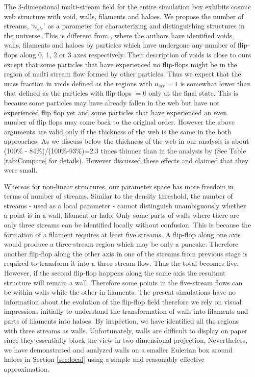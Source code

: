 The 3-dimensional multi-stream field for the entire simulation box exhibits cosmic web structure with void, walls, filaments and haloes. We propose the number of streams, `$n_{str}$' as a parameter for characterizing and distinguishing structures in the universe. This is different from \citet{Falck2015}, 
where the authors have identified voids, walls, filaments and haloes by particles which have undergone any number of flip-flops along 0, 1, 2 or 3 axes respectively. 
Their description of voids is close to ours except that some particles that have  experienced no flip-flops might be in the region
of multi stream flow formed by other particles.
Thus we expect that the mass fraction in voids defined as the regions with $n_{str} = 1$ is somewhat lower than that defined as the particles with 
flip-flops $= 0$ only at the final state. This is because some particles may have already fallen in the web but  have not experienced flip flop yet and 
some particles that have experienced an even number of flip flops may come back to the original order. However the above arguments are valid only if the thickness of the web is the same in the both approaches. As we discuss below the thickness of the web in our analysis is about (100\% - 84\%)/(100\%-93\%)=2.3 times thinner than in  the analysis by \citet{Falck2015} (See Table \ref{tab:Compare} for details). However  \citet{Falck2015} discussed these effects and claimed that they were small.

Whereas for non-linear structures, our parameter space has more freedom in terms of number of streams. 
Similar to the density threshold, the number of streams - used as a local parameter - cannot distinguish unambiguously whether a point is in a wall, 
filament or halo. Only some parts of walls where there are only three streams can be identified locally without confusion. This is because the formation of a filament
requires at least five streams. A flip-flop along one axis  would produce a three-stream region which may be only a pancake. 
 Therefore  another flip-flop along the other axis in one of the streams
from previous stage is required to transform it into a three-stream flow. Thus the total becomes five. However, if the second flip-flop happens along the same axis 
the resultant structure will remain a wall. Therefore some points in the five-stream flows can be within walls while the other in filaments. The present simulations have no information about the evolution of the flip-flop field
therefore we rely on visual impressions initially to understand the transformation of walls into filaments and parts of filaments into  haloes. By inspection, we have identified all the regions with three streams as walls. Unfortunately, walls are difficult to display on paper since they essentially block the view in two-dimensional projection. Nevertheless, we have demonstrated and analyzed walls on a smaller Eulerian box around haloes in Section \ref{sec:local} using a simple and reasonably effective approximation. 


